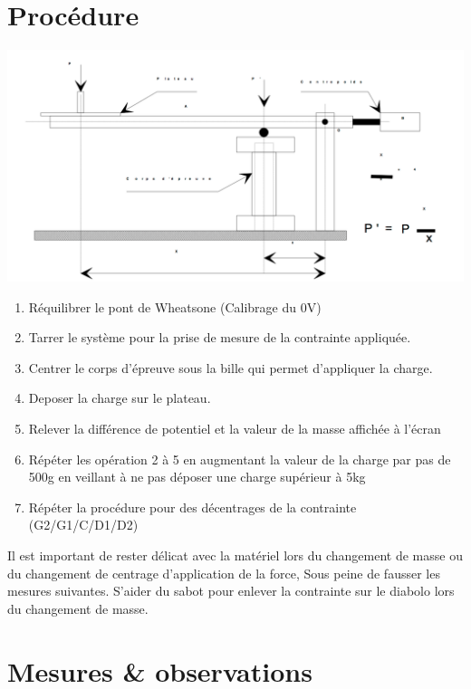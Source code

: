 \documentclass[11pt,a4paper]{report}
\begin{document}
\section*{Procédure}
\begin{center}
\includegraphics[scale=0.3]{Montage.jpg}
\end{center}
\begin{enumerate}
\item Réquilibrer le pont de Wheatsone (Calibrage du 0V)
\item Tarrer le système pour la prise de mesure de la contrainte appliquée.									
\item Centrer le corps d'épreuve sous la bille qui permet d'appliquer la charge.
\item Deposer la charge sur le plateau.
\item Relever la différence de potentiel  et la valeur de la masse affichée à l'écran
\item Répéter les opération 2 à 5 en augmentant la valeur de la charge par pas de 500g en veillant à ne pas déposer une charge supérieur à 5kg
\item Répéter la procédure pour des décentrages de la contrainte (G2/G1/C/D1/D2)
\end{enumerate} 


Il est important de rester délicat avec la matériel lors du changement de masse ou du changement de centrage d'application de la force, Sous peine de fausser les mesures suivantes. S'aider du sabot pour enlever la contrainte sur le diabolo lors du changement de masse.
\newpage
\section*{Mesures \& observations}
\end{document}
